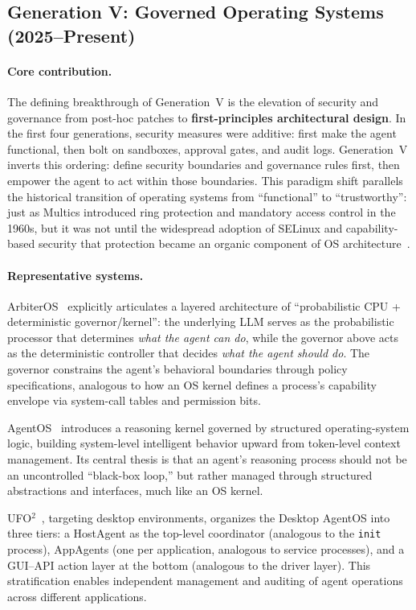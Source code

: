 \subsection{Generation V: Governed Operating Systems (2025--Present)}

\paragraph{Core contribution.}
The defining breakthrough of Generation~V is the elevation of security and governance from post-hoc patches to \textbf{first-principles architectural design}.
In the first four generations, security measures were additive: first make the agent functional, then bolt on sandboxes, approval gates, and audit logs.
Generation~V inverts this ordering: define security boundaries and governance rules first, then empower the agent to act within those boundaries.
This paradigm shift parallels the historical transition of operating systems from ``functional'' to ``trustworthy'': just as Multics introduced ring protection and mandatory access control in the 1960s, but it was not until the widespread adoption of SELinux and capability-based security that protection became an organic component of OS architecture~\cite{ostep_2023}.

\paragraph{Representative systems.}
ArbiterOS~\cite{arbiteros2025} explicitly articulates a layered architecture of ``probabilistic CPU + deterministic governor/kernel'': the underlying LLM serves as the probabilistic processor that determines \textit{what the agent can do}, while the governor above acts as the deterministic controller that decides \textit{what the agent should do}.
The governor constrains the agent's behavioral boundaries through policy specifications, analogous to how an OS kernel defines a process's capability envelope via system-call tables and permission bits.

AgentOS~\cite{agentos2025} introduces a reasoning kernel governed by structured operating-system logic, building system-level intelligent behavior upward from token-level context management.
Its central thesis is that an agent's reasoning process should not be an uncontrolled ``black-box loop,'' but rather managed through structured abstractions and interfaces, much like an OS kernel.

UFO$^2$~\cite{ufo2_2025}, targeting desktop environments, organizes the Desktop AgentOS into three tiers: a HostAgent as the top-level coordinator (analogous to the \texttt{init} process), AppAgents (one per application, analogous to service processes), and a GUI--API action layer at the bottom (analogous to the driver layer).
This stratification enables independent management and auditing of agent operations across different applications.

